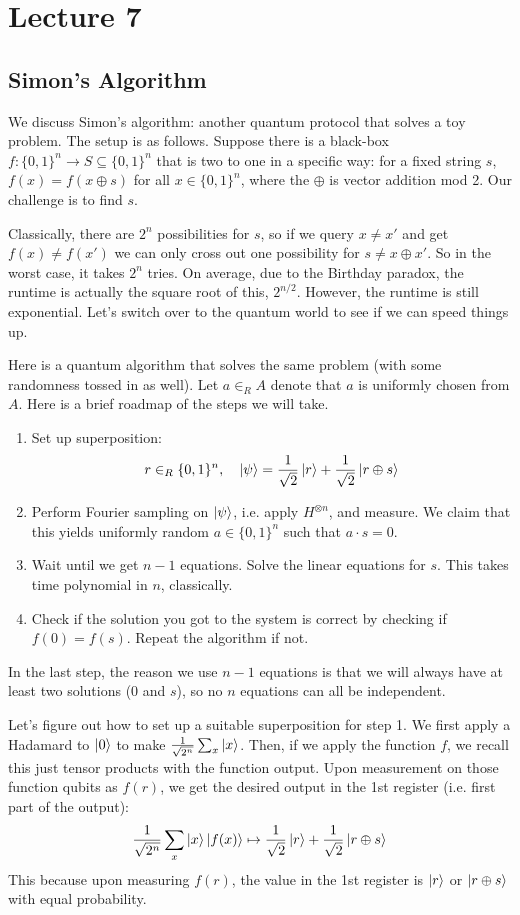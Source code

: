 
\section{Lecture 7}

\subsection{Simon's Algorithm}
We discuss Simon's algorithm: another quantum protocol that solves a toy problem. The setup is as follows.
Suppose there is a black-box $f: \{0, 1\}^n \to S \subseteq \{0, 1\}^n$ that is two to one in a specific way: for a fixed string $s$, $f(x) = f(x \oplus s)$ for all $x \in \{0, 1\}^n$,
where the $\oplus$ is vector addition mod 2. Our challenge is to find $s$.

Classically, there are $2^n$ possibilities for $s$, so if we query $x \neq x'$ and get $f(x) \neq f(x')$ we can only
cross out one possibility for $s \neq x \oplus x'$. So in the worst case, it takes $2^n$ tries. On average, due to the Birthday paradox,
the runtime is actually the square root of this, $2^{n/2}$. However, the runtime is still exponential. Let's switch over to the quantum world to see if we can speed things up.

Here is a quantum algorithm that solves the same problem (with some randomness tossed in as well). Let $a \in_R A$ denote that $a$ is uniformly chosen
from $A$. Here is a brief roadmap of the steps we will take.
\begin{enumerate}
    \item Set up superposition:
    \[ r \in_R \{0, 1\}^n, \quad \ket{\psi} = \frac{1}{\sqrt{2}} \ket{r} + \frac{1}{\sqrt{2}} \ket{r \oplus s} \]
    \item Perform Fourier sampling on $\ket{\psi}$, i.e. apply $H^{\otimes n}$, and measure. We claim that this yields uniformly random $a \in \{0, 1\}^n$ such that $a \cdot s = 0$.
    \item Wait until we get $n - 1$ equations. Solve the linear equations for $s$. This takes time polynomial in $n$, classically.
    \item Check if the solution you got to the system is correct by checking if $f(0) = f(s)$. Repeat the algorithm if not.
\end{enumerate}
In the last step, the reason we use $n - 1$ equations is that we will always have at least two solutions ($0$ and $s$), so no $n$ equations can all be independent.

Let's figure out how to set up a suitable superposition for step 1. We first apply a Hadamard to $\ket{0}$
to make $\frac{1}{\sqrt{2^n}}\sum_x \ket{x}$. Then, if we apply the function $f$, we recall this just tensor products with the function output. Upon measurement on those function qubits
as $f(r)$, we get the desired output in the 1st register (i.e. first part of the output):
\[ \frac{1}{\sqrt{2^n}} \sum_x \ket{x} \ket{f(x)} \mapsto \frac{1}{\sqrt{2}} \ket{r} + \frac{1}{\sqrt{2}} \ket{r \oplus s}  \]
This because upon measuring $f(r)$, the value in the 1st register is $\ket{r}$ or $\ket{r \oplus s}$ with equal probability.

